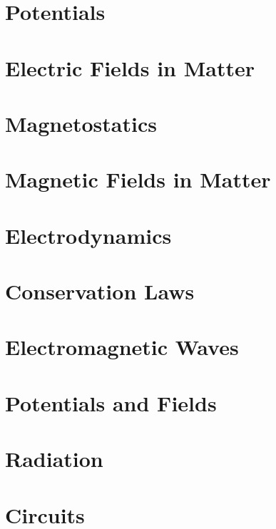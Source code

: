 \section{Potentials}


\section{Electric Fields in Matter}
\section{Magnetostatics}
\section{Magnetic Fields in Matter}
\section{Electrodynamics}
\section{Conservation Laws}
\section{Electromagnetic Waves}
\section{Potentials and Fields}
\section{Radiation}
\section{Circuits}

